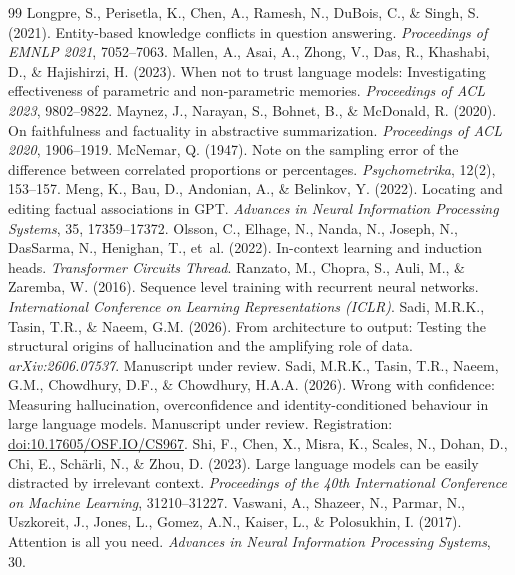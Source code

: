 \documentclass[11pt,a4paper,oneside]{report}
\begin{document}
\begin{thebibliography}{99}
 Longpre, S., Perisetla, K., Chen, A., Ramesh, N., DuBois, C., \& Singh, S. (2021). Entity-based knowledge conflicts in question answering. \emph{Proceedings of EMNLP 2021}, 7052--7063.
 Mallen, A., Asai, A., Zhong, V., Das, R., Khashabi, D., \& Hajishirzi, H. (2023). When not to trust language models: Investigating effectiveness of parametric and non-parametric memories. \emph{Proceedings of ACL 2023}, 9802--9822.
 Maynez, J., Narayan, S., Bohnet, B., \& McDonald, R. (2020). On faithfulness and factuality in abstractive summarization. \emph{Proceedings of ACL 2020}, 1906--1919.
 McNemar, Q. (1947). Note on the sampling error of the difference between correlated proportions or percentages. \emph{Psychometrika}, 12(2), 153--157.
 Meng, K., Bau, D., Andonian, A., \& Belinkov, Y. (2022). Locating and editing factual associations in GPT. \emph{Advances in Neural Information Processing Systems}, 35, 17359--17372.
 Olsson, C., Elhage, N., Nanda, N., Joseph, N., DasSarma, N., Henighan, T., et~al. (2022). In-context learning and induction heads. \emph{Transformer Circuits Thread}.
 Ranzato, M., Chopra, S., Auli, M., \& Zaremba, W. (2016). Sequence level training with recurrent neural networks. \emph{International Conference on Learning Representations (ICLR)}.
 Sadi, M.R.K., Tasin, T.R., \& Naeem, G.M. (2026). From architecture to output: Testing the structural origins of hallucination and the amplifying role of data. \emph{arXiv:2606.07537}. Manuscript under review.
 Sadi, M.R.K., Tasin, T.R., Naeem, G.M., Chowdhury, D.F., \& Chowdhury, H.A.A. (2026). Wrong with confidence: Measuring hallucination, overconfidence and identity-conditioned behaviour in large language models. Manuscript under review. Registration: \href{https://doi.org/10.17605/OSF.IO/CS967}{doi:10.17605/OSF.IO/CS967}.
 Shi, F., Chen, X., Misra, K., Scales, N., Dohan, D., Chi, E., Sch\"arli, N., \& Zhou, D. (2023). Large language models can be easily distracted by irrelevant context. \emph{Proceedings of the 40th International Conference on Machine Learning}, 31210--31227.
 Vaswani, A., Shazeer, N., Parmar, N., Uszkoreit, J., Jones, L., Gomez, A.N., Kaiser, L., \& Polosukhin, I. (2017). Attention is all you need. \emph{Advances in Neural Information Processing Systems}, 30.

\end{thebibliography}
\end{document}
